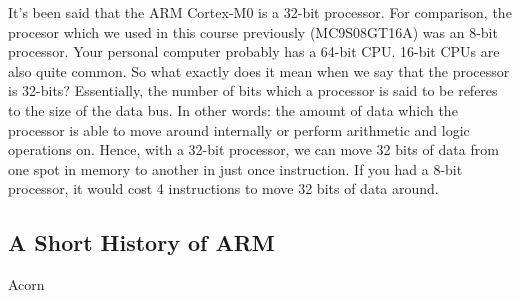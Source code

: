 It's been said that the ARM Cortex-M0 is a 32-bit processor. For comparison, the procesor which we used in this course previously (MC9S08GT16A) was an 8-bit processor. Your personal computer probably has a 64-bit CPU. 16-bit CPUs are also quite common. So what exactly does it mean when we say that the processor is 32-bits? Essentially, the number of bits which a processor is said to be referes to the size of the data bus. In other words: the amount of data which the processor is able to move around internally or perform arithmetic and logic operations on. Hence, with a 32-bit processor, we can move 32 bits of data from one spot in memory to another in just once instruction. If you had a 8-bit processor, it would cost 4 instructions to move 32 bits of data around.  



\subsection{A Short History of ARM}
Acorn

